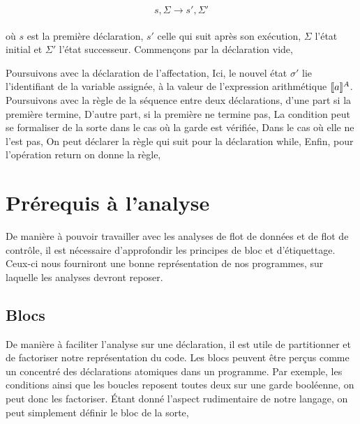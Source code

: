 \documentclass[a4paper, 10pt]{article}
\begin{document}
\[s, \Sigma \longrightarrow s', \Sigma'\]
\\
où $s$ est la première déclaration, $s'$ celle qui suit après son exécution, 
$\Sigma$ l'état initial et $\Sigma'$  l'état successeur. Commençons 
par la déclaration vide,

\srule{ }{\semanticd{\sskip}{\sigma}{\emptyset}{\sigma}}

Poursuivons avec la déclaration de l'affectation,
Ici, le nouvel état $\sigma'$ lie l'identifiant de la variable assignée, à la 
valeur de l'expression arithmétique $[\![{a}]\!]^{A}$. Poursuivons avec la règle 
de la séquence entre deux déclarations, d'une part si la première termine,
{}
D'autre part, si la première ne termine pas,
{}
La condition peut se formaliser de la sorte dans le cas où la garde est vérifiée,
{}
Dans le cas où elle ne l'est pas,
{}
On peut déclarer la règle qui suit pour la déclaration while,
{}
Enfin, pour l'opération return on donne la règle,

\section{Prérequis à l'analyse}
De manière à pouvoir travailler avec les analyses de flot de données et de flot de contrôle, 
il est nécessaire d'approfondir les principes de bloc et d'étiquettage. Ceux-ci nous fourniront
une bonne représentation de nos programmes, sur laquelle les analyses devront reposer.

\subsection{Blocs}
De manière à faciliter l'analyse sur une déclaration, il est utile de partitionner et de factoriser notre représentation du code. 
Les blocs peuvent être perçus comme un concentré des déclarations atomiques dans un programme. Par exemple, les conditions ainsi
que les boucles reposent toutes deux sur une garde booléenne, on peut donc les factoriser. 
Étant donné l'aspect rudimentaire de notre langage, on peut simplement définir le bloc de la sorte,
\end{document}
